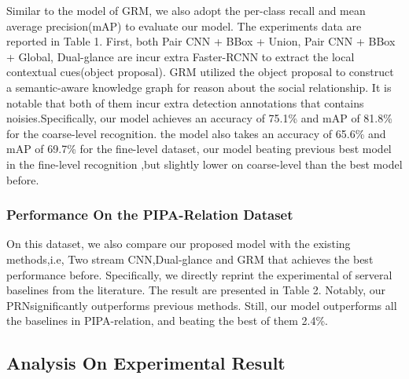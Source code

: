 \documentclass{article}
\newcommand{\PRN}{{\sf PRN}}
\begin{document}
Similar to the model of GRM, we also adopt the per-class recall and mean average precision(mAP) to evaluate our model. The experiments data are reported in Table 1. First, both Pair CNN + BBox + Union, Pair CNN + BBox + Global, Dual-glance are incur extra Faster-RCNN\cite{DBLP:conf/nips/RenHGS15} to extract the local contextual cues(object proposal). GRM utilized the object proposal to construct a semantic-aware  knowledge graph for reason about the social relationship. It is notable that both of them incur extra detection annotations that contains noisies.Specifically, our model achieves an accuracy of 75.1\% and mAP of 81.8\% for the coarse-level recognition. the model also takes an accuracy of 65.6\% and mAP of 69.7\% for the fine-level dataset, our model beating previous best model in the fine-level recognition ,but slightly lower on coarse-level than the best model before.

\subsubsection{Performance On the PIPA-Relation Dataset}

On this dataset, we also compare our proposed model with the existing methods,i.e, Two stream CNN\cite{DBLP:conf/cvpr/SunSF17},Dual-glance\cite{DBLP:conf/iccv/LiWZK17} and GRM\cite{DBLP:conf/ijcai/WangCRYCL18} that achieves the best performance before. Specifically, we directly reprint the experimental of serveral baselines from the literature. The result are presented in Table 2. Notably, our \PRN significantly outperforms previous methods. Still, our model outperforms all the baselines in PIPA-relation, and beating the best of them 2.4\%.  

\subsection{Analysis On Experimental Result}
\end{document}
